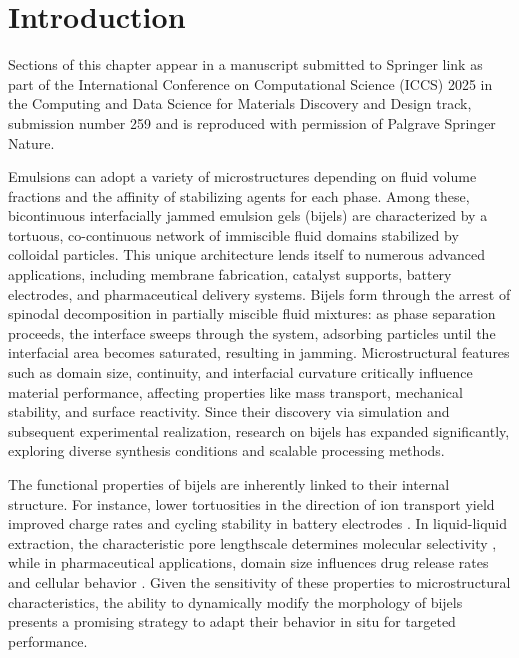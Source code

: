 \section{Introduction}

Sections of this chapter appear in a manuscript submitted to Springer link as part of the International Conference on Computational 
Science (ICCS) 2025 in the Computing and Data Science for Materials Discovery and Design track, submission number 259 and is
reproduced with permission of Palgrave Springer Nature. 

Emulsions can adopt a variety of microstructures depending on fluid volume fractions and the affinity of stabilizing agents for each phase. Among these, bicontinuous 
interfacially jammed emulsion gels (bijels) are characterized by a tortuous, co-continuous network of immiscible fluid domains stabilized by colloidal particles. This 
unique architecture lends itself to numerous advanced applications, including membrane fabrication, catalyst supports, battery electrodes, and pharmaceutical delivery 
systems. Bijels form through the arrest of spinodal decomposition in partially miscible fluid mixtures: as phase separation proceeds, the interface sweeps through the 
system, adsorbing particles until the interfacial area becomes saturated, resulting in jamming. Microstructural features such as domain size, continuity, and interfacial 
curvature critically influence material performance, affecting properties like mass transport, mechanical stability, and surface reactivity. Since their discovery via 
simulation and subsequent experimental realization, research on bijels has expanded significantly, exploring diverse synthesis conditions and scalable processing methods.

The functional properties of bijels are inherently linked to their internal structure. For instance, lower tortuosities in the direction of ion transport yield improved 
charge rates and cycling stability in battery electrodes \cite{ebner_tortuosity_2014, samdani_bicontinuous_2017}. In liquid-liquid extraction, the characteristic pore 
lengthscale determines molecular selectivity \cite{khan_nanostructured_2022}, while in pharmaceutical applications, domain size influences drug release rates and cellular 
behavior \cite{vanoli_bijels_2022, thorson_bijel-templated_2019}. Given the sensitivity of these properties to microstructural characteristics, the ability to dynamically 
modify the morphology of bijels presents a promising strategy to adapt their behavior in situ for targeted performance.

